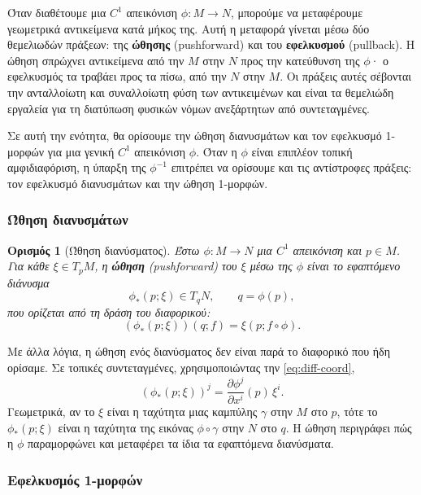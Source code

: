 \documentclass[11pt,a4paper,twoside,openright]{book}
\newtheorem{definition}[lemma]{Ορισμός}
\begin{document}
Όταν διαθέτουμε μια $C^1$ απεικόνιση $\phi: M \to N$, μπορούμε να μεταφέρουμε γεωμετρικά αντικείμενα κατά μήκος της. Αυτή η μεταφορά γίνεται μέσω δύο θεμελιωδών πράξεων: της \textbf{ώθησης} (pushforward) και του \textbf{εφελκυσμού} (pullback). Η ώθηση σπρώχνει αντικείμενα από την $M$ στην $N$ προς την κατεύθυνση της $\phi$· ο εφελκυσμός τα τραβάει προς τα πίσω, από την $N$ στην $M$. Οι πράξεις αυτές σέβονται την ανταλλοίωτη και συναλλοίωτη φύση των αντικειμένων και είναι τα θεμελιώδη εργαλεία για τη διατύπωση φυσικών νόμων ανεξάρτητων από συντεταγμένες.

Σε αυτή την ενότητα, θα ορίσουμε την ώθηση διανυσμάτων και τον εφελκυσμό 1-μορφών για μια γενική $C^1$ απεικόνιση $\phi$. Όταν η $\phi$ είναι επιπλέον τοπική αμφιδιαφόριση, η ύπαρξη της $\phi^{-1}$ επιτρέπει να ορίσουμε και τις αντίστροφες πράξεις: τον εφελκυσμό διανυσμάτων και την ώθηση 1-μορφών.

\subsubsection{Ώθηση διανυσμάτων}

\begin{definition}[Ώθηση διανύσματος]
Έστω $\phi: M \to N$ μια $C^1$ απεικόνιση και $p \in M$. Για κάθε $\xi \in T_pM$, η \textbf{ώθηση} (pushforward) του $\xi$ μέσω της $\phi$ είναι το εφαπτόμενο διάνυσμα
\begin{equation}
\phi_*(p; \xi) \in T_{q}N, \qquad q = \phi(p),
\end{equation}
που ορίζεται από τη δράση του διαφορικού:
\begin{equation}
(\phi_*(p; \xi))(q; f) = \xi(p; f \circ \phi). \label{eq:pushforward-def}
\end{equation}
\end{definition}

Με άλλα λόγια, η ώθηση ενός διανύσματος δεν είναι παρά το διαφορικό που ήδη ορίσαμε. Σε τοπικές συντεταγμένες, χρησιμοποιώντας την \eqref{eq:diff-coord},
\begin{equation}
(\phi_*(p; \xi))^j = \frac{\partial \phi^j}{\partial x^i}(p) \, \xi^i. \label{eq:pushforward-coord}
\end{equation}
Γεωμετρικά, αν το $\xi$ είναι η ταχύτητα μιας καμπύλης $\gamma$ στην $M$ στο $p$, τότε το $\phi_*(p; \xi)$ είναι η ταχύτητα της εικόνας $\phi \circ \gamma$ στην $N$ στο $q$. Η ώθηση περιγράφει πώς η $\phi$ παραμορφώνει και μεταφέρει τα ίδια τα εφαπτόμενα διανύσματα.

\subsubsection{Εφελκυσμός 1-μορφών}
\end{document}
